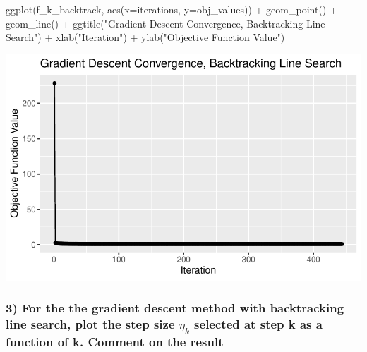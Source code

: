 \documentclass[
  letterpaper,
  DIV=11,
  numbers=noendperiod]{scrartcl}
\newenvironment{Shaded}{\begin{snugshade}}{\end{snugshade}}
\newcommand{\AttributeTok}[1]{\textcolor[rgb]{0.40,0.45,0.13}{#1}}
\newcommand{\FunctionTok}[1]{\textcolor[rgb]{0.28,0.35,0.67}{#1}}
\newcommand{\NormalTok}[1]{\textcolor[rgb]{0.00,0.23,0.31}{#1}}
\newcommand{\SpecialCharTok}[1]{\textcolor[rgb]{0.37,0.37,0.37}{#1}}
\newcommand{\StringTok}[1]{\textcolor[rgb]{0.13,0.47,0.30}{#1}}
\begin{document}
\begin{Shaded}
\begin{Highlighting}[]
\FunctionTok{ggplot}\NormalTok{(f\_k\_backtrack, }\FunctionTok{aes}\NormalTok{(}\AttributeTok{x=}\NormalTok{iterations, }\AttributeTok{y=}\NormalTok{obj\_values)) }\SpecialCharTok{+} 
  \FunctionTok{geom\_point}\NormalTok{() }\SpecialCharTok{+} 
  \FunctionTok{geom\_line}\NormalTok{() }\SpecialCharTok{+} 
  \FunctionTok{ggtitle}\NormalTok{(}\StringTok{"Gradient Descent Convergence, Backtracking Line Search"}\NormalTok{) }\SpecialCharTok{+} 
  \FunctionTok{xlab}\NormalTok{(}\StringTok{"Iteration"}\NormalTok{) }\SpecialCharTok{+} \FunctionTok{ylab}\NormalTok{(}\StringTok{"Objective Function Value"}\NormalTok{)}
\end{Highlighting}
\end{Shaded}

\includegraphics{506021334_Stats102B_hw_1_files/figure-pdf/unnamed-chunk-1-2.pdf}

\subsubsection{\texorpdfstring{3) For the the gradient descent method
with backtracking line search, plot the step size \(η_k\) selected at
step k as a function of k. Comment on the
result}{3) For the the gradient descent method with backtracking line search, plot the step size η\_k selected at step k as a function of k. Comment on the result}}\label{for-the-the-gradient-descent-method-with-backtracking-line-search-plot-the-step-size-ux3b7_k-selected-at-step-k-as-a-function-of-k.-comment-on-the-result}
\end{document}
